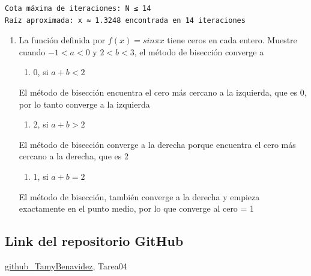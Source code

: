 \documentclass[
  english,
  letterpaper,
  DIV=11,
  numbers=noendperiod]{scrartcl}
\providecommand{\tightlist}{%
  \setlength{\itemsep}{0pt}\setlength{\parskip}{0pt}}
\begin{document}
\begin{verbatim}
Cota máxima de iteraciones: N ≤ 14
Raíz aproximada: x ≈ 1.3248 encontrada en 14 iteraciones
\end{verbatim}

\begin{enumerate}
\def\labelenumi{\arabic{enumi}.}
\setcounter{enumi}{1}
\item
  La función definida por \(𝑓(𝑥) = sin 𝜋 𝑥\) tiene ceros en cada entero.
  Muestre cuando \(−1 < 𝑎 < 0\) y \(2 < 𝑏 < 3\), el método de bisección
  converge a

  \begin{enumerate}
  \def\labelenumii{\alph{enumii}.}
  \tightlist
  \item
    0, si \(a+b < 2\)
  \end{enumerate}

  El método de bisección encuentra el cero más cercano a la izquierda,
  que es 0, por lo tanto converge a la izquierda

  \begin{enumerate}
  \def\labelenumii{\alph{enumii}.}
  \setcounter{enumii}{1}
  \tightlist
  \item
    2, si \(a+b > 2\)
  \end{enumerate}

  El método de bisección converge a la derecha porque encuentra el cero
  más cercano a la derecha, que es 2

  \begin{enumerate}
  \def\labelenumii{\alph{enumii}.}
  \setcounter{enumii}{2}
  \tightlist
  \item
    1, si \(a+b = 2\)
  \end{enumerate}

  El método de bisección, también converge a la derecha y empieza
  exactamente en el punto medio, por lo que converge al cero = 1
\end{enumerate}

\subsection{Link del repositorio
GitHub}\label{link-del-repositorio-github}

\href{https://github.com/TamyBenavidez/Tarea04.git}{github\_TamyBenavidez},
Tarea04
\end{document}
